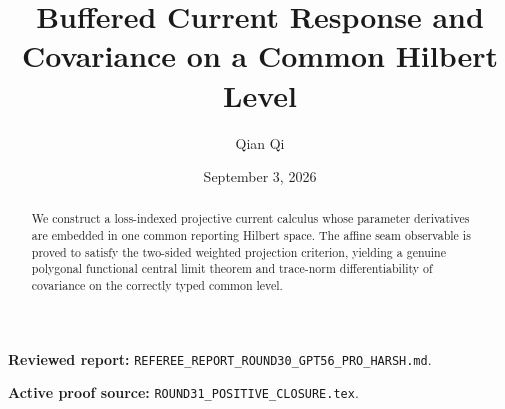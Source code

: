 \documentclass[11pt,reqno]{amsart}
\title[A1 Round 31 revision]{Buffered Current Response and Covariance on a Common Hilbert Level}
\author{Qian Qi}
\date{September 3, 2026}
\begin{document}
\begin{abstract}
We construct a loss-indexed projective current calculus whose parameter derivatives are embedded in one common reporting Hilbert space.  The affine seam observable is proved to satisfy the two-sided weighted projection criterion, yielding a genuine polygonal functional central limit theorem and trace-norm differentiability of covariance on the correctly typed common level.
\end{abstract}
\maketitle
\noindent\textbf{Reviewed report:} \texttt{REFEREE\_REPORT\_ROUND30\_GPT56\_PRO\_HARSH.md}.\par
\noindent\textbf{Active proof source:} \texttt{ROUND31\_POSITIVE\_CLOSURE.tex}.\par

\end{document}
